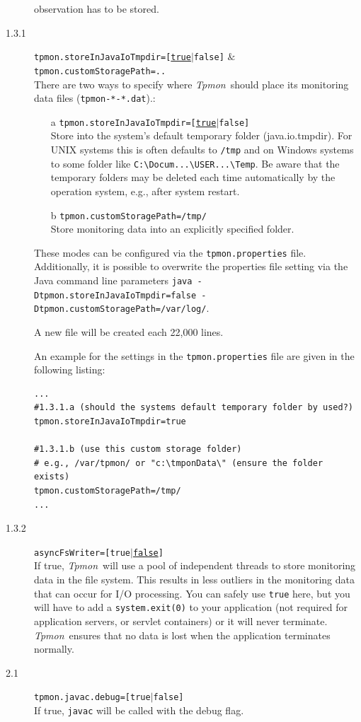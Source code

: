 \documentclass[a4paper,12pt]{scrartcl}
\newcommand{\tpmon}{\textit{Tpmon}}
\begin{document}
\begin{description}
observation has to be stored.
\item [1.3.1] \footnotesize \texttt{tpmon.storeInJavaIoTmpdir=[\underline{true}$|$false]} $\&$ \texttt{tpmon.customStoragePath=..} \normalsize \\ 
There are two ways to specify where \tpmon\ should place its monitoring data files (\texttt{tpmon-*-*.dat}).: 
\begin{enumerate}
\item [a] \texttt{tpmon.storeInJavaIoTmpdir=[\underline{true}$|$false]} \\ Store into the system's default temporary folder (java.io.tmpdir). For UNIX systems this is often defaults to \texttt{/tmp} and on Windows systems to some folder like \verb=C:\Docum...\USER...\Temp=. Be aware that the temporary folders may be deleted each time automatically by the operation system, e.g., after system restart.
\item [b] \texttt{tpmon.customStoragePath=/tmp/} \\ Store monitoring data into an explicitly specified folder.
\end{enumerate}
These modes can be configured via the \texttt{tpmon.properties} file. Additionally, it is possible to overwrite the properties file setting via the Java command line parameters \footnotesize \texttt{java -Dtpmon.storeInJavaIoTmpdir=false -Dtpmon.customStoragePath=/var/log/}. \normalsize 

A new file will be created each 22,000 lines.

An example for the settings in the \texttt{tpmon.properties} file are given in the following listing:
\begin{lstlisting}[caption={Linux/Unix: Specification of the monitoring data storage location}]
...
#1.3.1.a (should the systems default temporary folder by used?)
tpmon.storeInJavaIoTmpdir=true

#1.3.1.b (use this custom storage folder)
# e.g., /var/tpmon/ or "c:\tmponData\" (ensure the folder exists)
tpmon.customStoragePath=/tmp/
...
\end{lstlisting}

\item [1.3.2] \texttt{asyncFsWriter=[true$|$\underline{false}]} \\ 
If true, \tpmon\ will use a pool of independent threads to store monitoring data in the file system. This results in less outliers in the monitoring data that can occur for I/O processing. You can safely use \texttt{true} here, but you will have to add a \texttt{system.exit(0)} to your application (not required for application servers, or servlet containers) or it will never terminate. \tpmon\ ensures that no data is lost when the application terminates normally.
\item [2.1] \texttt{tpmon.javac.debug=[true$|$\texttt{false}]} \\
If true, \texttt{javac} will be called with the debug flag. 
\end{description}
\end{document}
